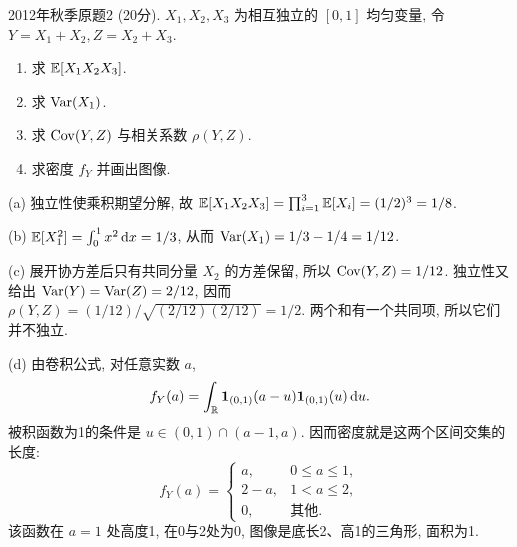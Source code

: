 \begin{exercise}\label{m2:2012f:q2}
2012年秋季原题2 (20分). $X_1,X_2,X_3$ 为相互独立的 $[0,1]$ 均匀变量, 令 $Y=X_1+X_2,Z=X_2+X_3$.
\begin{enumerate}
\item[(a)]\label{m2:2012f:q2:a} 求 $\mathbb E[X_1X_2X_3]$.
\item[(b)]\label{m2:2012f:q2:b} 求 $\operatorname{Var}(X_1)$.
\item[(c)]\label{m2:2012f:q2:c} 求 $\operatorname{Cov}(Y,Z)$ 与相关系数 $\rho(Y,Z)$.
\item[(d)]\label{m2:2012f:q2:d} 求密度 $f_Y$ 并画出图像.
\end{enumerate}
\end{exercise}
\begin{solution}
(a) 独立性使乘积期望分解, 故 $\mathbb E[X_1X_2X_3]=\prod_{i=1}^3\mathbb E[X_i]=(1/2)^3=1/8$.

(b) $\mathbb E[X_1^2]=\int_0^1x^2\,\mathrm d x=1/3$, 从而 $\operatorname{Var}(X_1)=1/3-1/4=1/12$.

(c) 展开协方差后只有共同分量 $X_2$ 的方差保留, 所以 $\operatorname{Cov}(Y,Z)=1/12$. 独立性又给出 $\operatorname{Var}(Y)=\operatorname{Var}(Z)=2/12$, 因而 $\rho(Y,Z)=(1/12)/\sqrt{(2/12)(2/12)}=1/2$. 两个和有一个共同项, 所以它们并不独立.

(d) 由卷积公式, 对任意实数 $a$,
\[
f_Y(a)=\int_{\mathbb R}\mathbf 1_{(0,1)}(a-u)\mathbf 1_{(0,1)}(u)\,\mathrm d u.
\]
被积函数为1的条件是 $u\in(0,1)\cap(a-1,a)$. 因而密度就是这两个区间交集的长度:
\[
f_Y(a)=\begin{cases}a,&0\le a\le1,\\2-a,&1<a\le2,\\0,&\text{其他}.\end{cases}
\]
该函数在 $a=1$ 处高度1, 在0与2处为0, 图像是底长2、高1的三角形, 面积为1.
\begin{center}
\end{center}
\end{solution}

